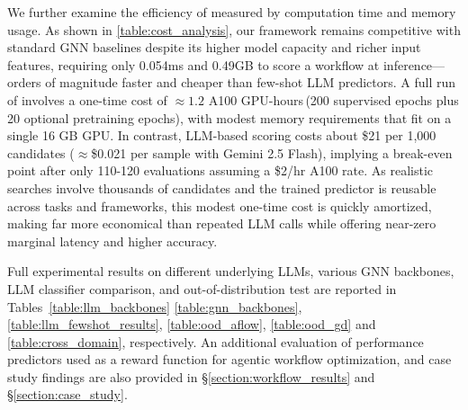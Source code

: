 We further examine the efficiency of \ours{} measured by computation time and memory usage. As shown in \autoref{table:cost_analysis}, our framework remains competitive with standard GNN baselines despite its higher model capacity and richer input features, requiring only 0.054ms and 0.49GB to score a workflow at inference---orders of magnitude faster and cheaper than few-shot LLM predictors. A full run of \ours{} involves a one-time cost of $\approx1.2$ A100 GPU-hours\,(200 supervised epochs plus 20 optional pretraining epochs), with modest memory requirements that fit on a single 16 GB GPU. In contrast, LLM-based scoring costs about \$21 per 1,000 candidates ($\approx$\$0.021 per sample with Gemini 2.5 Flash), implying a break-even point after only 110-120 evaluations assuming a \$2/hr A100 rate. As realistic searches involve thousands of candidates and the trained predictor is reusable across tasks and frameworks, this modest one-time cost is quickly amortized, making \ours{} far more economical than repeated LLM calls while offering near-zero marginal latency and higher accuracy.




Full experimental results on different underlying LLMs, various GNN backbones, LLM classifier comparison, and out-of-distribution test are reported in Tables~\ref{table:llm_backbones} \ref{table:gnn_backbones}, \ref{table:llm_fewshot_results}, \ref{table:ood_aflow}, \ref{table:ood_gd} and \ref{table:cross_domain}, respectively. An additional evaluation of performance predictors used as a reward function for agentic workflow optimization, and case study findings are also provided in \S\ref{section:workflow_results} and \S\ref{section:case_study}.


